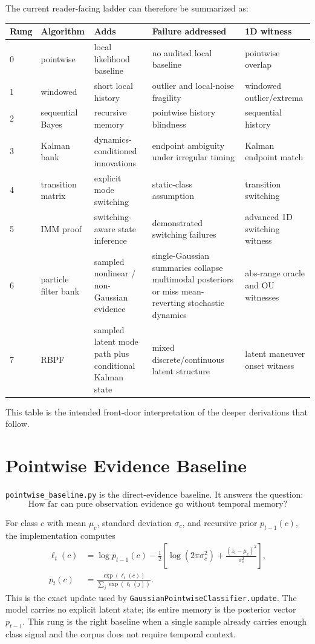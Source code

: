 \documentclass[11pt]{article}
\begin{document}
The current reader-facing ladder can therefore be summarized as:
\begin{center}
\small
\begin{tabular}{p{}p{}p{}p{}p{}}
\toprule
Rung & Algorithm & Adds & Failure addressed & 1D witness \\
\midrule
0 & pointwise & local likelihood baseline & no audited local baseline & pointwise overlap \\
1 & windowed & short local history & outlier and local-noise fragility & windowed outlier/extrema \\
2 & sequential Bayes & recursive memory & pointwise history blindness & sequential history \\
3 & Kalman bank & dynamics-conditioned innovations & endpoint ambiguity under irregular timing & Kalman endpoint match \\
4 & transition matrix & explicit mode switching & static-class assumption & transition switching \\
5 & IMM proof & switching-aware state inference & demonstrated switching failures & advanced 1D switching witness \\
6 & particle filter bank & sampled nonlinear / non-Gaussian evidence & single-Gaussian summaries collapse multimodal posteriors or miss mean-reverting stochastic dynamics & abs-range oracle and OU witnesses \\
7 & RBPF & sampled latent mode path plus conditional Kalman state & mixed discrete/continuous latent structure & latent maneuver onset witness \\
\bottomrule
\end{tabular}
\end{center}
This table is the intended front-door interpretation of the deeper derivations
that follow.

\section{Pointwise Evidence Baseline}

\texttt{pointwise\_baseline.py} is the direct-evidence baseline. It answers the
question:
\begin{equation}
    \text{How far can pure observation evidence go without temporal memory?}
\end{equation}

For class \(c\) with mean \(\mu_c\), standard deviation \(\sigma_c\), and
recursive prior \(p_{t-1}(c)\), the implementation computes
\begin{align}
    \ell_t(c)
    &= \log p_{t-1}(c)
    - \frac{1}{2}\left[
        \log\!\left(2\pi \sigma_c^2\right)
        + \frac{(z_t - \mu_c)^2}{\sigma_c^2}
    \right], \\
    p_t(c)
    &= \frac{\exp(\ell_t(c))}{\sum_j \exp(\ell_t(j))}.
\end{align}
This is the exact update used by
\texttt{GaussianPointwiseClassifier.update}. The model carries no explicit
latent state; its entire memory is the posterior vector \(p_{t-1}\).
This rung is the right baseline when a single sample already carries enough
class signal and the corpus does not require temporal context.
\end{document}
